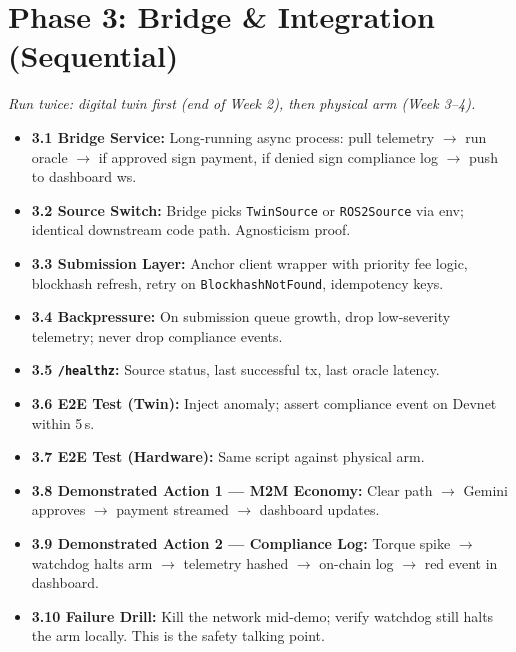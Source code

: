 \documentclass[11pt, a4paper]{article}
\begin{document}
\section{Phase 3: Bridge \& Integration (Sequential)}
\textit{Run twice: digital twin first (end of Week 2), then physical arm (Week 3--4).}
\begin{itemize}
    \item \textbf{3.1 Bridge Service:} Long-running async process: pull telemetry $\rightarrow$ run oracle $\rightarrow$ if approved sign payment, if denied sign compliance log $\rightarrow$ push to dashboard ws.
    \item \textbf{3.2 Source Switch:} Bridge picks \texttt{TwinSource} or \texttt{ROS2Source} via env; identical downstream code path. Agnosticism proof.
    \item \textbf{3.3 Submission Layer:} Anchor client wrapper with priority fee logic, blockhash refresh, retry on \texttt{BlockhashNotFound}, idempotency keys.
    \item \textbf{3.4 Backpressure:} On submission queue growth, drop low-severity telemetry; never drop compliance events.
    \item \textbf{3.5 \texttt{/healthz}:} Source status, last successful tx, last oracle latency.
    \item \textbf{3.6 E2E Test (Twin):} Inject anomaly; assert compliance event on Devnet within 5\,s.
    \item \textbf{3.7 E2E Test (Hardware):} Same script against physical arm.
    \item \textbf{3.8 Demonstrated Action 1 --- M2M Economy:} Clear path $\rightarrow$ Gemini approves $\rightarrow$ payment streamed $\rightarrow$ dashboard updates.
    \item \textbf{3.9 Demonstrated Action 2 --- Compliance Log:} Torque spike $\rightarrow$ watchdog halts arm $\rightarrow$ telemetry hashed $\rightarrow$ on-chain log $\rightarrow$ red event in dashboard.
    \item \textbf{3.10 Failure Drill:} Kill the network mid-demo; verify watchdog still halts the arm locally. This is the safety talking point.
\end{itemize}
\end{document}
